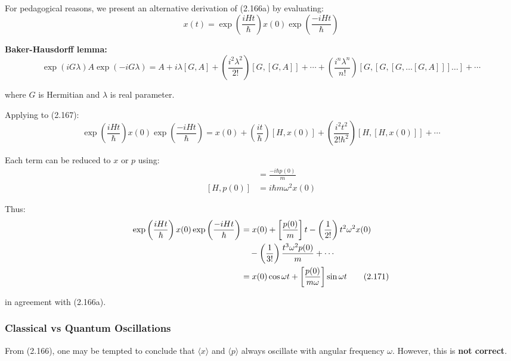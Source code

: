 \documentclass[11pt,a4paper]{article}
\begin{document}
For pedagogical reasons, we present an alternative derivation of (2.166a) by evaluating:
\begin{equation}
x(t) = \exp\left(\frac{iHt}{\hbar}\right)x(0)\exp\left(\frac{-iHt}{\hbar}\right)
\tag{2.167}
\end{equation}

\textbf{Baker-Hausdorff lemma:}
\begin{equation}
\exp(iG\lambda)A\exp(-iG\lambda) = A + i\lambda[G,A] + \left(\frac{i^2\lambda^2}{2!}\right)[G,[G,A]] + \cdots + \left(\frac{i^n\lambda^n}{n!}\right)[G,[G,[G,\ldots[G,A]]]\ldots] + \cdots
\tag{2.168}
\end{equation}

where $G$ is Hermitian and $\lambda$ is real parameter.

Applying to (2.167):
\begin{equation}
\exp\left(\frac{iHt}{\hbar}\right)x(0)\exp\left(\frac{-iHt}{\hbar}\right) = x(0) + \left(\frac{it}{\hbar}\right)[H,x(0)] + \left(\frac{i^2t^2}{2!\hbar^2}\right)[H,[H,x(0)]] + \cdots
\tag{2.169}
\end{equation}

Each term can be reduced to $x$ or $p$ using:
\begin{align}
[H,x(0)] &= \frac{-i\hbar p(0)}{m} \tag{2.170a} \\
[H,p(0)] &= i\hbar m\omega^2 x(0) \tag{2.170b}
\end{align}

Thus:
\begin{align}
\exp\left(\frac{iHt}{\hbar}\right)x(0)\exp\left(\frac{-iHt}{\hbar}\right) &= x(0) + \left[\frac{p(0)}{m}\right]t - \left(\frac{1}{2!}\right)t^2\omega^2 x(0) \notag \\
&\quad - \left(\frac{1}{3!}\right)\frac{t^3\omega^2 p(0)}{m} + \cdots \notag \\
&= x(0)\cos\omega t + \left[\frac{p(0)}{m\omega}\right]\sin\omega t
\tag{2.171}
\end{align}

in agreement with (2.166a).

\subsubsection{Classical vs Quantum Oscillations}

From (2.166), one may be tempted to conclude that $\langle x\rangle$ and $\langle p\rangle$ always oscillate with angular frequency $\omega$. However, this is \textbf{not correct}.
\end{document}
